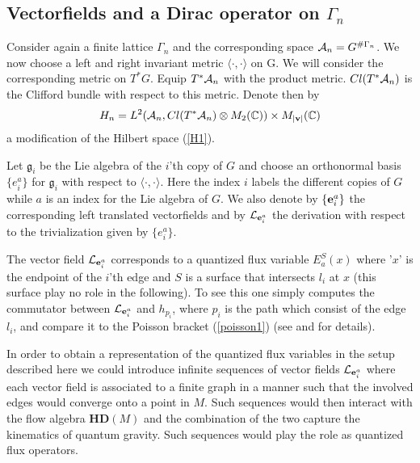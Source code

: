 \documentclass[12pt]{article}
\def\G{\Gamma}
\def\ca{{\cal A}}
\def\cl{{\cal L}}
\begin{document}
\subsection{Vectorfields and a Dirac operator on $\G_n$}
\label{hulk}



Consider again a finite lattice $\G_n$ and the corresponding space $\ca_n=G^{\# \G_n}$. We now choose a left and right invariant metric $\langle \cdot,\cdot\rangle$ on G. We will consider the corresponding metric on $T^*G$. %
Equip $T^*\ca_n$ with the product metric. %
$Cl(T^*\ca_{n})$ is the Clifford bundle with respect to this metric.
Denote then by
$$
H_n = L^2(\ca_n,Cl(T^*\ca_{n})\otimes M_2(\mathbb{C}))\times M_{ \vert {\bf v} \vert}(\mathbb{C})
$$
a modification of the Hilbert space (\ref{H1}).

Let $\mathfrak{g}_i$ be the Lie algebra of the $i$'th copy of $G$ and choose an orthonormal basis $\{e_i^a\}$ for $\mathfrak{g}_i$ with respect to $\langle \cdot,\cdot\rangle$. Here the index $i$ labels the different copies of $G$ while $a$ is an index for the Lie algebra of $G$.  We also denote by $\{{\bf e}_i^a\}$ the corresponding left translated vectorfields and by $\cl_{{\bf e}_i^a}$ the derivation with respect to the trivialization given by $\{e_i^a\}$. 

The vector field $\cl_{{\bf e}_i^a}$ corresponds to a quantized flux variable $E^S_a(x)$ where '$x$' is the endpoint of the $i$'th edge and $S$ is a surface that intersects $l_i$ at $x$ (this surface play no role in the following). To see this one simply computes the commutator between $\cl_{{\bf e}_i^a}$ and $h_{p_i}$, where $p_i$ is the path which consist of the edge $l_i$, and compare it to the Poisson bracket (\ref{poisson1}) (see \cite{AGNP1} and \cite{Aastrup:2009ra} for details). 

In order to obtain a representation of the quantized flux variables in the setup described here we could introduce infinite sequences of vector fields $\cl_{{\bf e}_i^a}$ where each vector field is associated to a finite graph in a manner such that the involved edges would converge onto a point in $M$. Such sequences would then interact with the flow algebra $\mathbf{HD}(M) $ and the combination of the two capture the kinematics of quantum gravity.  Such sequences would play the role as quantized flux operators.
\end{document}
